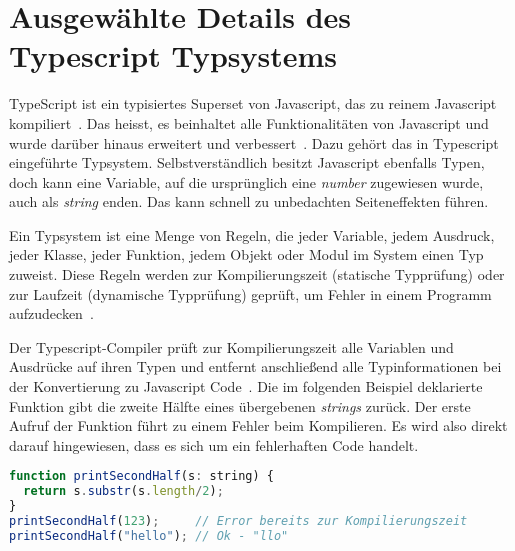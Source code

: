 

\section{Ausgewählte Details des Typescript Typsystems}
\label{sec:basics:typescript}
TypeScript ist ein typisiertes Superset von Javascript, das zu reinem Javascript kompiliert~\cite{typescript}.
Das heisst, es beinhaltet alle Funktionalitäten von Javascript und wurde darüber hinaus erweitert und verbessert~\cite{superset}.
Dazu gehört das in Typescript eingeführte Typsystem. Selbstverständlich besitzt Javascript ebenfalls Typen, doch kann eine Variable,
auf die ursprünglich eine \emph{number} zugewiesen wurde, auch als \emph{string} enden. Das kann schnell zu unbedachten Seiteneffekten führen.

Ein Typsystem ist eine Menge von Regeln, die jeder Variable, jedem Ausdruck, jeder Klasse,
jeder Funktion, jedem Objekt oder Modul im System einen Typ zuweist.
Diese Regeln werden zur  Kompilierungszeit (statische Typprüfung) oder zur Laufzeit (dynamische Typprüfung) geprüft,
um Fehler in einem Programm aufzudecken~\cite{typescript-typesystem-medium}.

Der Typescript-Compiler prüft zur Kompilierungszeit alle Variablen und Ausdrücke auf ihren Typen und entfernt anschließend alle Typinformationen
bei der Konvertierung zu Javascript Code~\cite{typescript-github-specification}.
Die im folgenden Beispiel deklarierte Funktion gibt die zweite Hälfte eines übergebenen \emph{strings} zurück.
Der erste Aufruf der Funktion führt zu einem Fehler beim Kompilieren. Es wird also direkt darauf hingewiesen, dass es sich um ein fehlerhaften Code handelt.


\begin{lstlisting}[language=Javascript,float=h!,caption={Typescript Funktion mit typisiertem Parameter}, label={fig:basics:typescript:1}]
function printSecondHalf(s: string) {
  return s.substr(s.length/2);
}
printSecondHalf(123);     // Error bereits zur Kompilierungszeit
printSecondHalf("hello"); // Ok - "llo"
\end{lstlisting}


